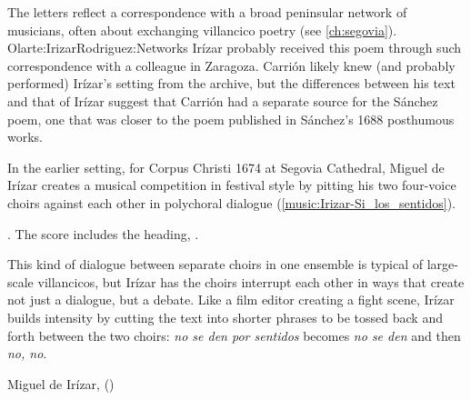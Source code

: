 The letters reflect a correspondence with a broad peninsular network of
musicians, often about exchanging villancico poetry (see \cref{ch:segovia}).%
    \Autocite{LopezCalo:IrizarLetters1}{Olarte:Irizar}{Rodriguez:Networks}
Irízar probably received this poem through such correspondence with a colleague
in Zaragoza.
Carrión likely knew (and probably performed) Irízar's setting from the archive,
but the differences between his text and that of Irízar suggest that Carrión had
a separate source for the Sánchez poem, one that was closer to the poem
published in Sánchez's 1688 posthumous works.%
    \Autocite[171--172]{Sanchez:LiraPoetica}

In the earlier setting, for Corpus Christi 1674 at Segovia Cathedral, Miguel de
Irízar creates a musical competition in festival style by pitting his two
four-voice choirs against each other in polychoral dialogue
(\cref{music:Irizar-Si_los_sentidos}).%
\begin{Footnote}
    \Autocite[133--148]{Cashner:WLSCM32}.  
    The score includes the heading, .
\end{Footnote}
This kind of dialogue between separate choirs in one ensemble is typical of
large-scale villancicos, but Irízar has the choirs interrupt each other in ways
that create not just a dialogue, but a debate.
Like a film editor creating a fight scene, Irízar builds intensity by cutting
the text into shorter phrases to be tossed back and forth between the two
choirs: \emph{no se den por sentidos} becomes \emph{no se den} and then
\emph{no, no}.

\begin{musicexample}
    \caption{Miguel de Irízar,  ()}

    \label{music:Irizar-Si_los_sentidos}
\end{musicexample}

